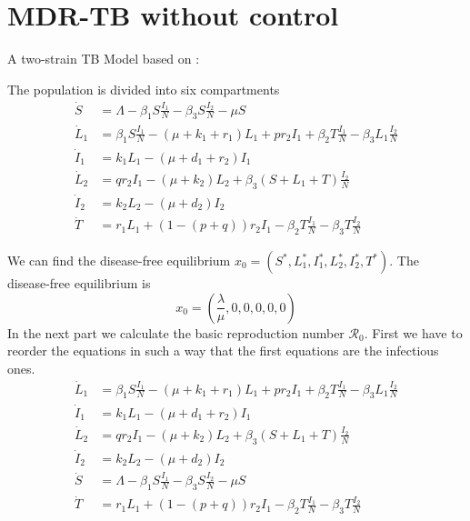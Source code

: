 \section{MDR-TB without control}  \label{Chap4-Sect1} 

A two-strain TB Model based on \cite{Castillo-Chavez1997}:

The population is divided into six compartments
\begin{align*}
	\dot{S}	&= 
    	\Lambda -\beta_{1} S \frac{I_1}{N} - \beta_{3}S\frac{I_2}{N} - 
        \mu S 
        \\
    \dot{L}_1 &= 
    	\beta_{1}S \frac{I_1}{N} - (\mu + k_1 + r_1)L_{1} + 
        pr_2 I_1 + \beta_{2} T \frac{I_1}{N} -
        \beta_{3} L_{1}\frac{I_2}{N}  
        \\
    \dot{I}_1 &=  
    	k_1 L_{1} - (\mu + d_1 + r_2)I_1  
        \\
    \dot{L}_2 &=  
    	q r_2 I_1 - (\mu + k_2)L_2 + \beta_{3}(S + L_1 + 
        T)\frac{I_2}{N}  
        \\
    \dot{I}_2 &=  
    	k_2 L_2 - (\mu + d_2)I_2  
        \\
    \dot{T} &=  
    	r_1 L_{1} + (1-(p+q))r_2 I_1 - \beta_{2} T \frac{I_1}{N} - 
        \beta_{3}T\frac{I_2}{N}  
\end{align*}



We can find the disease-free equilibrium 
$x_0 = (S^*, L_{1}^{*}, I_{1}^{*}, L_{2}^{*}, I_{2}^{*}, T^{*})$.
The disease-free equilibrium is 
$$
    x_0 = \left(\frac{\lambda}{\mu}, 0 , 0 ,0, 0, 0\right)
$$
In the next part we calculate the basic reproduction number $\mathscr{R}_{0}$. 
First we have to reorder the equations in such a way that the first equations
are the infectious ones.
\begin{align*}
    \dot{L}_1 &= 
    	\beta_{1}S \frac{I_1}{N} - (\mu + k_1 + r_1)L_{1} + 
        pr_2 I_1 + \beta_{2} T \frac{I_1}{N} -
        \beta_{3} L_{1}\frac{I_2}{N}  
        \\
    \dot{I}_1 &=  
    	k_1 L_{1} - (\mu + d_1 + r_2)I_1  
        \\
    \dot{L}_2 &=  
    	q r_2 I_1 - (\mu + k_2)L_2 + \beta_{3}(S + L_1 + 
        T)\frac{I_2}{N}  
        \\
    \dot{I}_2 &=  
    	k_2 L_2 - (\mu + d_2)I_2  
        \\
    \dot{S}	&= 
    	\Lambda -\beta_{1} S \frac{I_1}{N} - \beta_{3}S\frac{I_2}{N} - 
        \mu S 
        \\
    \dot{T} &=  
    	r_1 L_{1} + (1-(p+q))r_2 I_1 - \beta_{2} T \frac{I_1}{N} - 
        \beta_{3}T\frac{I_2}{N}  
\end{align*}

